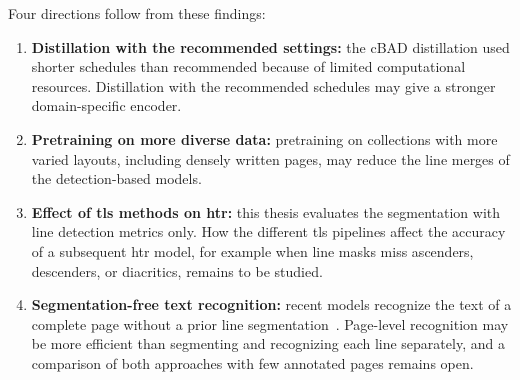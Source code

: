Four directions follow from these findings:
\begin{enumerate}
    \item \textbf{Distillation with the recommended settings:} the cBAD distillation used shorter schedules than recommended because of limited computational resources. Distillation with the recommended schedules may give a stronger domain-specific encoder.
    \item \textbf{Pretraining on more diverse data:} pretraining on collections with more varied layouts, including densely written pages, may reduce the line merges of the detection-based models.
    \item \textbf{Effect of \gls{tls} methods on \gls{htr}:} this thesis evaluates the segmentation with line detection metrics only. How the different \gls{tls} pipelines affect the accuracy of a subsequent \gls{htr} model, for example when line masks miss ascenders, descenders, or diacritics, remains to be studied.
    \item \textbf{Segmentation-free text recognition:} recent models recognize the text of a complete page without a prior line segmentation~\cite{coquenet2023dan}. Page-level recognition may be more efficient than segmenting and recognizing each line separately, and a comparison of both approaches with few annotated pages remains open.
\end{enumerate}

